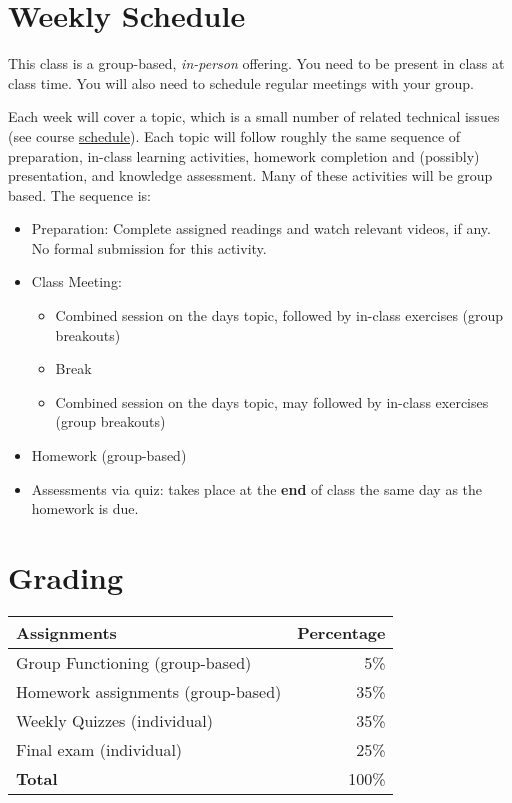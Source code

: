 \documentclass[11pt]{article}
\begin{document}
\section{Weekly Schedule}



This class is a group-based, \emph{in-person} offering. You need to be
present in class at class time. You will also need to schedule regular
meetings with your group.

Each week will cover a topic, which is a small number of related
technical issues (see course \href{https://github.com/nguyenthanhvuh/class-oo/wiki/Assignments}{schedule}). Each
topic will follow roughly the same sequence of preparation, in-class
learning activities, homework completion and (possibly) presentation,
and knowledge assessment. Many of these activities will be group based.
The sequence is:

\begin{itemize}
\item
  Preparation: Complete assigned readings and watch relevant videos, if
  any. No formal submission for this activity.
\item
  Class Meeting:

  \begin{itemize}
  \item
    Combined session on the day\textquotesingle s topic, followed by
    in-class exercises (group breakouts)
  \item
    Break
  \item
    Combined session on the day\textquotesingle s topic, may followed by
    in-class exercises (group breakouts)
  \end{itemize}
\item
  Homework (group-based)
\item
  Assessments via quiz: takes place at the \textbf{end} of class the
  same day as the homework is due.
\end{itemize}

\section{Grading}\label{sec:grading}

\begin{tabular}{lr}
\textbf{Assignments} & \textbf{Percentage} \\
\hline
Group Functioning (group-based) & 5\% \\
Homework assignments (group-based) & 35\% \\
Weekly Quizzes (individual) & 35\% \\
  Final exam (individual) & 25\% \\
  \hline
    \textbf{Total} & 100\% \\
\end{tabular}
\end{document}
